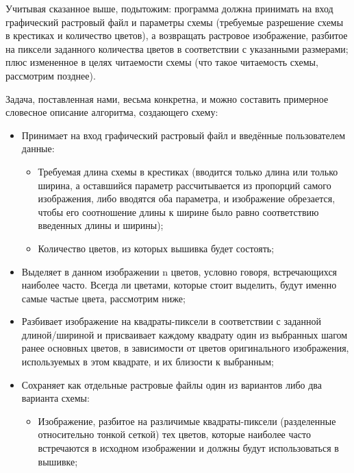 \documentclass[12pt]{article}
\begin{document}
{	Учитывая сказанное выше, подытожим: программа должна принимать на вход графический растровый файл и параметры схемы (требуемые разрешение схемы в крестиках и количество цветов), а возвращать растровое изображение, разбитое на пиксели заданного количества цветов в соответствии с указанными размерами; плюс измененное в целях читаемости схемы (что такое читаемость схемы, рассмотрим позднее).
	
	Задача, поставленная нами, весьма конкретна, и можно составить примерное словесное описание алгоритма, создающего схему:
	
	\begin{itemize}
	\item Принимает на вход графический растровый файл и введённые пользователем данные: 
		\begin{itemize}
		\item Требуемая длина схемы в крестиках (вводится только длина или только ширина, а оставшийся параметр рассчитывается из пропорций самого изображения, либо вводятся оба параметра, и изображение обрезается, чтобы его соотношение длины к ширине было равно соответствию введенных длины и ширины);
	
		\item Количество цветов, из которых вышивка будет состоять;
		\end{itemize}
	\item Выделяет в данном изображении n цветов, условно говоря, встречающихся наиболее часто. Всегда ли цветами, которые стоит выделить, будут именно самые частые цвета, рассмотрим ниже;
	
	\item Разбивает изображение на квадраты-пиксели в соответствии с заданной длиной/шириной и присваивает каждому квадрату один из выбранных шагом ранее основных цветов, в зависимости от цветов оригинального изображения, используемых в этом квадрате, и их близости к выбранным;
	
	\item Сохраняет как отдельные растровые файлы один из вариантов либо два варианта схемы:
		\begin{itemize}
		\item Изображение, разбитое на различимые квадраты-пиксели (разделенные относительно тонкой сеткой) тех цветов, которые наиболее часто встречаются в исходном изображении и должны будут использоваться в вышивке;
	

\end{itemize}
\end{itemize}}
\end{document}
